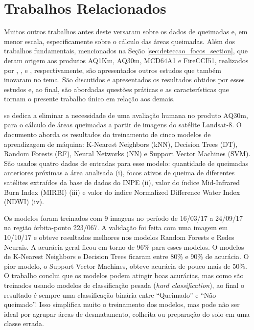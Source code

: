 \documentclass[cic,tc]{iiufrgs}
\begin{document}
\section{Trabalhos Relacionados}
\label{sec:trabalhos_relacionados}

Muitos outros trabalhos antes deste versaram sobre os dados de queimadas e, em menor escala, especificamente sobre o cálculo das áreas queimadas. Além dos trabalhos fundamentais, mencionados na Seção \ref{sec:deteccao_focos_section}, que deram origem aos produtos AQ1Km, AQ30m, MCD64A1 e FireCCI51, realizados por \citet{libonati2015algorithm}, \citet{melchiori2014landsat}, \citet{GIGLIO201872} e \citet{Lizundia2020}, respectivamente, são apresentados outros estudos que também inovaram no tema. São discutidos e apresentados os resultados obtidos por esses estudos e, ao final, são abordadas questões práticas e as características que tornam o presente trabalho único em relação aos demais.

\citet{dosclassificaccao} se dedica a eliminar a necessidade de uma avaliação humana no produto AQ30m, para o cálculo de áreas queimadas a partir de imagens do satélite Landsat-8. O documento aborda os resultados do treinamento de cinco modelos de aprendizagem de máquina: K-Nearest Neighbors (kNN), Decision Trees (DT), Random Forests (RF), Neural Networks (NN) e Support Vector Machines (SVM). São usados quatro dados de entradas para esse modelo: quantidade de queimadas anteriores próximas a área analisada (i), focos ativos de queima de diferentes satélites extraídos da base de dados do INPE (ii), valor do índice Mid-Infrared Burn Index (MIRBI) (iii) e valor do índice Normalized Difference Water Index (NDWI) (iv).

Os modelos foram treinados com 9 imagens no período de 16/03/17 a 24/09/17 na região órbita-ponto 223/067. A validação foi feita com uma imagem em 10/10/17 e obteve resultados melhores nos modelos Random Forests e Redes Neurais. A acurácia geral ficou em torno de 96\% para esses modelos. O modelos de K-Nearest Neighbors e Decision Trees ficaram entre 80\% e 90\% de acurácia. O pior modelo, o Support Vector Machines, obteve acurácia de pouco mais de 50\%. O trabalho conclui que os modelos podem atingir boas acurácias, mas como são treinados usando modelos de classificação pesada (\textit{hard classification}), ao final o resultado é sempre uma classificação binária entre ``Queimado'' e ``Não queimado''. Isso simplifica muito o treinamento dos modelos, mas pode não ser ideal por agrupar áreas de desmatamento, colheita ou preparação do solo em uma classe errada.
\end{document}
